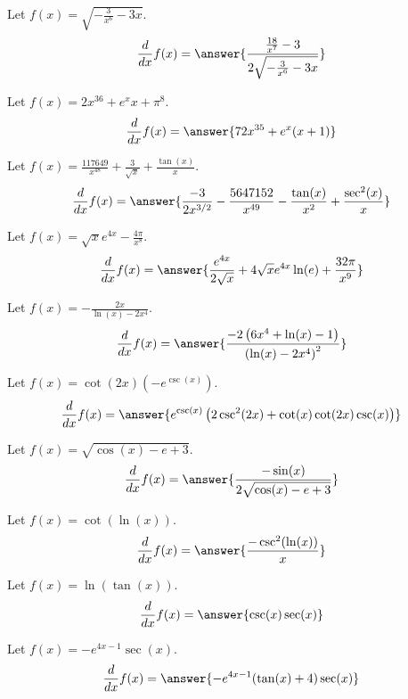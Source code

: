 \documentclass{ximera}
\begin{document}
\begin{shuffle}
\begin{exercise}
Let $f(x)=\sqrt{-\frac{3}{x^6}-3 x}$.
\[
\ddx f(x) = \answer{\frac{\frac{18}{x^7}-3}{2 \sqrt{-\frac{3}{x^6}-3 x}}}
\]
\end{exercise}

\begin{exercise}
Let $f(x)=2 x^{36}+e^x x+\pi ^8$.
\[
\ddx f(x) = \answer{72 x^{35}+e^x (x+1)}
\]
\end{exercise}

\begin{exercise}
Let $f(x)=\frac{117649}{x^{48}}+\frac{3}{\sqrt{x}}+\frac{\tan (x)}{x}$.
\[
\ddx f(x) = \answer{\frac{-3}{2 x^{3/2}}-\frac{5647152}{x^{49}}-\frac{\tan (x)}{x^2}+\frac{\sec ^2(x)}{x}}
\]
\end{exercise}

\begin{exercise}
Let $f(x)=\sqrt{x} e^{4 x}-\frac{4 \pi }{x^8}$.
\[
\ddx f(x) = \answer{\frac{e^{4 x}}{2 \sqrt{x}}+4 \sqrt{x} e^{4 x} \ln (e)+\frac{32 \pi }{x^9}}
\]
\end{exercise}

\begin{exercise}
Let $f(x)=-\frac{2 x}{\ln (x)-2 x^4}$.
\[
\ddx f(x) = \answer{\frac{-2 \left(6 x^4+\ln (x)-1\right)}{\left(\ln (x)-2 x^4\right)^2}}
\]
\end{exercise}

\begin{exercise}
Let $f(x)=\cot (2 x) \left(-e^{\csc (x)}\right)$.
\[
\ddx f(x) = \answer{e^{\csc (x)} \left(2 \csc ^2(2 x)+\cot (x) \cot (2 x) \csc (x)\right)}
\]
\end{exercise}

\begin{exercise}
Let $f(x)=\sqrt{\cos (x)-e+3}$.
\[
\ddx f(x) = \answer{\frac{-\sin (x)}{2 \sqrt{\cos (x)-e+3}}}
\]
\end{exercise}

\begin{exercise}
Let $f(x)=\cot (\ln (x))$.
\[
\ddx f(x) = \answer{\frac{-\csc ^2(\ln (x))}{x}}
\]
\end{exercise}

\begin{exercise}
Let $f(x)=\ln (\tan (x))$.
\[
\ddx f(x) = \answer{\csc (x) \sec (x)}
\]
\end{exercise}

\begin{exercise}
Let $f(x)=-e^{4 x-1} \sec (x)$.
\[
\ddx f(x) = \answer{-e^{4 x-1} (\tan (x)+4) \sec (x)}
\]
\end{exercise}


\end{shuffle}
\end{document}

